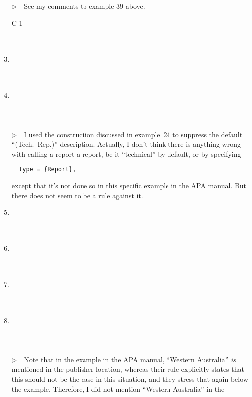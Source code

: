 \documentclass{article}
\newcommand{\EM}{\ensuremath{\triangleright\quad}}
\newcommand{\cmd}[1]{\texttt{\string#1}}%
\begin{document}
\begin{enumerate}
      \EM See my comments to example 39 above.
\item[C-1] \cite{C-1}  \\ \cite{C-1} \\  \\ 
\item \cite{ex41} \\ \cite{ex41}\\ \\ 
\item \cite{ex42} \\ \cite{ex42}\\ \\ \\
      \EM I used the \cmd{\bibnotype} construction discussed
      in example~24 to suppress the default ``(Tech.\ Rep.{})''
      description. Actually, I don't think there is anything wrong with
      calling a report a report, be it ``technical'' by default, or by
      specifying
\begin{verbatim}
  type = {Report},
\end{verbatim}
      except that it's not done so in this specific example in the
      APA manual. But there does not seem to be a rule against it.
\item \cite{ex43} \\ \cite{ex43}\\ \\ 
\item \cite{ex44} \\ \cite{ex44}\\ \\ 
\item \cite{ex45} \\ \cite{ex45}\\ \\ 
\item \cite{ex46} \\ \cite{ex46}\\ \\ \\
      \EM Note that in the example in the APA manual, ``Western Australia''
      \emph{is} mentioned in the publisher location, whereas their rule
      explicitly states that this should not be the case in this
      situation, and they stress that again below the example.
      Therefore, I did not mention ``Western Australia'' in the

\end{enumerate}
\end{document}
